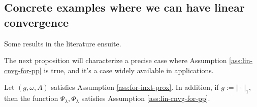 \documentclass[12pt]{article}
\begin{document}
    \subsection{Concrete examples where we can have linear convergence}
        Some results in the literature ensuite.  
        \begin{definition}
            
        \end{definition}
        \begin{definition}
            
        \end{definition}
        \begin{fact}
            
        \end{fact}
        \begin{fact}
            
        \end{fact}
        The next proposition will characterize a precise case where Assumption \ref{ass:lin-cnvg-for-pp} is true, and it's a case widely available in applications. 
        \begin{proposition}\label{prop:1nrm-prox-problem}
            Let $(g, \omega, A)$ satisfies Assumption \ref{ass:for-inxt-prox}. 
            In addition, if $g := \Vert \cdot\Vert_1$, then the function $\Psi_\lambda, \Phi_\lambda$ satisfies Assumption \ref{ass:lin-cnvg-for-pp}. 
        \end{proposition}
\end{document}
